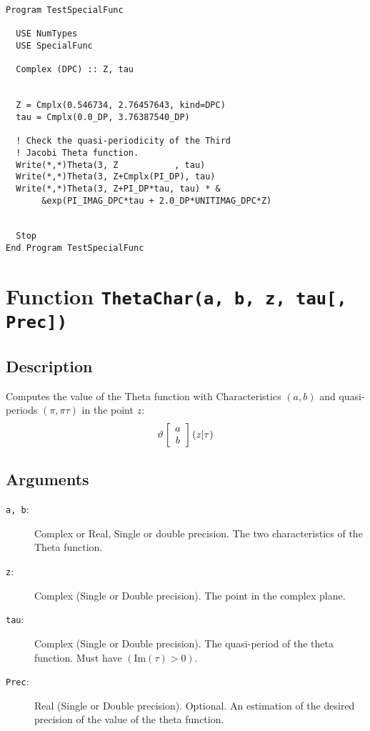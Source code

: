 \begin{lstlisting}[emph=Theta,
                   emphstyle=\color{blue},
                   frame=trBL,
                   caption=Computing the Jacobi Theta functions.,
                   label=theta]
Program TestSpecialFunc

  USE NumTypes
  USE SpecialFunc

  Complex (DPC) :: Z, tau


  Z = Cmplx(0.546734, 2.76457643, kind=DPC)
  tau = Cmplx(0.0_DP, 3.76387540_DP)

  ! Check the quasi-periodicity of the Third
  ! Jacobi Theta function.
  Write(*,*)Theta(3, Z           , tau)
  Write(*,*)Theta(3, Z+Cmplx(PI_DP), tau)
  Write(*,*)Theta(3, Z+PI_DP*tau, tau) * &
       &exp(PI_IMAG_DPC*tau + 2.0_DP*UNITIMAG_DPC*Z)


  Stop
End Program TestSpecialFunc
\end{lstlisting}

\section{Function \texttt{ThetaChar(a, b, z, tau[, Prec])}}

\subsection{Description}

Computes the value of the Theta function with Characteristics $(a,b)$
and quasi-periods $(\pi,\pi\tau)$ in the point $z$:
\begin{equation}
  \vartheta\left[ \begin{array}{c} a \\ b \end{array}\right]\left(z|\tau\right)
\end{equation}

\subsection{Arguments}

\begin{description}
\item[\texttt{a, b}:] Complex or Real, Single or double precision. The
  two characteristics of the Theta function.
\item[\texttt{z}:] Complex (Single or Double precision). The point in
  the complex plane.
\item[\texttt{tau}:] Complex (Single or Double precision). The
  quasi-period of the theta function. Must have $(\textrm{Im}(\tau)>0)$.
\item[\texttt{Prec}:] Real (Single or Double precision). Optional. An
  estimation of the desired precision of the value of the theta
  function. 
\end{description}

